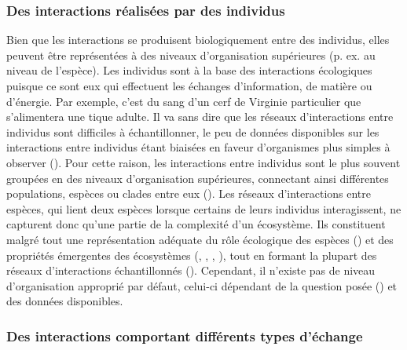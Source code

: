 \subsubsection{Des interactions réalisées par des individus} 

Bien que les interactions se produisent biologiquement entre des individus,
elles peuvent être représentées à des niveaux d'organisation supérieures (p. ex.
au niveau de l'espèce). Les individus sont à la base des interactions
écologiques puisque ce sont eux qui effectuent les échanges d'information, de
matière ou d'énergie. Par exemple, c'est du sang d'un cerf de Virginie
particulier que s'alimentera une tique adulte. Il va sans dire que les réseaux
d'interactions entre individus sont difficiles à échantillonner, le peu de
données disponibles sur les interactions entre individus étant biaisées en
faveur d'organismes plus simples à observer (\cite{Guimaraes2020Structure}).
Pour cette raison, les interactions entre individus sont le plus souvent
groupées en des niveaux d'organisation supérieures, connectant ainsi différentes
populations, espèces ou clades entre eux (\cite{Elton1927Animal}). Les réseaux
d'interactions entre espèces, qui lient deux espèces lorsque certains de leurs
individus interagissent, ne capturent donc qu'une partie de la complexité d'un
écosystème. Ils constituent malgré tout une représentation adéquate du rôle
écologique des espèces (\cite{Delmas2019Analysing}) et des propriétés émergentes
des écosystèmes (\cite{Loreau2010Populations}, \cite{McCann2011Food},
\cite{Bascompte2013Mutualistic}, \cite{Gonzalez2020Scalingup}), tout en formant
la plupart des réseaux d'interactions échantillonnés
(\cite{Guimaraes2020Structure}). Cependant, il n'existe pas de niveau
d'organisation approprié par défaut, celui-ci dépendant de la question posée
(\cite{Niquil2020Shifting}) et des données disponibles.

\subsubsection{Des interactions comportant différents types d'échange} 

